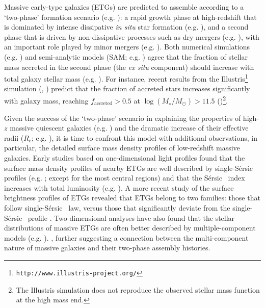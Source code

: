 \documentclass[fleqn,usenatbib]{mnras}
\def\ser{{S\'{e}rsic\ }}
\def\logms{{$\log (M_{\star}/M_{\odot})$}}
\begin{document}
    Massive early-type galaxies (ETGs) are predicted to assemble according to a 
    `two-phase' formation scenario 
    (e.g. \citealt{Oser2010, Oser2012}): a rapid growth phase at high-redshift that 
    is dominated by intense dissipative \textit{in situ} star formation (e.g.
    \citealt{Hopkins2008, Dekel2009}), and a second phase that 
    is driven by non-dissipative processes such as dry mergers 
    (e.g. \citealt{Naab2006, Khochfar2006}), with an important role played by 
    minor mergers 
    (e.g. \citealt{Hilz2012, Hilz2013, Oogi2013, Bedorf2013, Laporte2013}).
    Both numerical simulations (e.g. \citealt{Oser2010}) and semi-analytic models 
    (SAM; e.g. \citealt{LeeYi2013, LeeYi2017}) agree that the fraction of stellar 
    mass accreted in the second phase (the \textit{ex situ} component) should increase 
    with total galaxy stellar mass (e.g. \citealt{Lackner2012, Cooper2013, Qu2017}).
    For instance, recent results from the 
    Illustris\footnote{\texttt{http://www.illustris-project.org/}} simulation 
    (\citealt{Vogelsberger2014}, \citealt{Genel2014}) predict that the fraction of  
    accreted stars increases significantly with galaxy mass, reaching
    $f_{\mathrm{accreted}}>0.5$ at \logms{}$>11.5$ 
    (\citealt{RodriguezGomez2016})\footnote{The Illustris simulation
    does not reproduce the observed stellar mass function at the high mass end.}. 

    Given the success of the `two-phase' scenario in explaining the properties of 
    high-$z$ massive quiescent galaxies (e.g. \citealt{vanDokkum2010, vanderWel2011,
    vandeSande2011, Belli2014}) and the dramatic increase of their effective radii 
    ($R_{\mathrm{e}}$; e.g. \citealt{Newman2012, vdWel2014}), it is time to confront 
    this model with additional observations, in particular, the detailed surface 
    mass density profiles of low-redshift massive galaxies. 
    Early studies based on one-dimensional light profiles found that the surface 
    mass density profiles of nearby ETGs are well described by single-\ser{} profiles 
    (e.g. \citealt{Kormendy2009}; except for the most central regions) and that the 
    \ser{} index increases with total luminosity 
    (e.g. \citealt{Graham2013}). 
    A more recent study of the surface brightness profiles of ETGs 
    revealed that ETGs belong to two families: 
    those that follow single-\ser{} law, versus those that significantly deviate from 
    the single-\ser{} profile \citep{Schombert2015}.  
    Two-dimensional analyses have also found that the stellar distributions of massive 
    ETGs are often better described by multiple-component models 
    (e.g. \citealt{Huang2013a, Oh2017}).  
    \citet{Huang2013b}, further suggesting a connection between the multi-component 
    nature of massive galaxies and their two-phase assembly histories.
    
\end{document}

